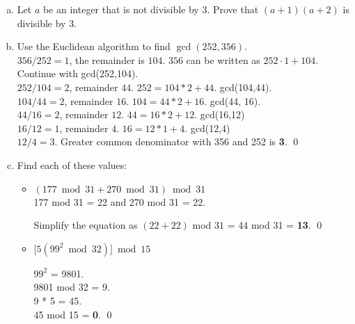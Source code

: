 \documentclass[12pt]{article}
\begin{document}
\begin{enumerate}[a)]
\item Let $a$ be an integer that is not divisible by 3. Prove that
  $(a+1)(a+2)$ is divisible by 3.

\medskip

\item Use the Euclidean algorithm to find $\gcd(252,356)$. \\

  $356/252 = 1$, the remainder is $104$. $356$ can be written as $252 \cdot 1 + 104$. Continue with gcd(252,104). \\

  $252/104 = 2$, remainder $44$. $252 = 104 * 2 + 44$. gcd(104,44). \\

  $104/44 = 2$, remainder $16$. $104 = 44 * 2 + 16$. gcd(44, 16). \\

  $44/16 = 2$, remainder $12$. $44 = 16 * 2 + 12$. gcd(16,12) \\

  $ 16 / 12 = 1$, remainder $4$. $16 = 12 * 1 + 4$. gcd(12,4) \\

  $12/4 = 3$. Greater common denominator with 356 and 252 is \textbf{3}.
  \qed
  
\medskip

\item Find each of these values:
  \begin{itemize}
  \item $(177\bmod 31 + 270\bmod 31)\bmod 31$ \\

    177 mod 31 = 22 and 270 mod 31 = 22.

    Simplify the equation as $(22 + 22)$ mod $31$ = 44 mod 31 = \textbf{13}.
    \qed
    \medskip
  \item $\bigl[5(99^2\bmod 32)\bigr]\bmod 15$

    $99^2$ = 9801. \\

    9801 mod 32 = 9. \\

    9 * 5 = 45. \\

    45 mod 15 = \textbf{0}.
    \qed
    
  \end{itemize}
\end{enumerate}

\bigskip
\end{document}
